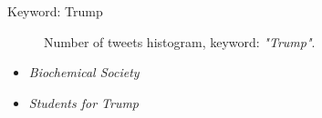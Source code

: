 \documentclass[notheorems,12pt]{beamer}
\begin{document}
\begin{frame}{Keyword: Trump}
    \vspace{-1cm}
    \begin{figure}
        \centering
        \hspace{-0.5cm}
        \vspace{-0.7cm}
        \caption*{Number of tweets histogram, keyword: \textit{"Trump"}.}
    \end{figure}
	\begin{itemize}
		\item \textit{Biochemical Society}
		\item \textit{Students for Trump}
	\end{itemize}
\end{frame}
\end{document}
